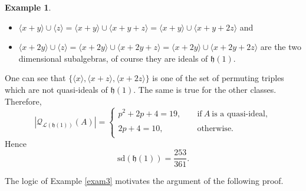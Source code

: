 \documentclass{amsart}
\theoremstyle{definition}
\newtheorem{example}[theorem]{Example}
\numberwithin{equation}{section}
\begin{document}
\begin{example}
\begin{itemize}
\item [3.] $\langle x+y \rangle\cup \langle z \rangle= \langle x+y \rangle\cup \langle x+y+z \rangle=
\langle x+y \rangle\cup \langle x+y+2z \rangle$ and 

\item [4.] $\langle x+2y \rangle\cup \langle z \rangle= \langle x+2y \rangle\cup \langle x+2y+z \rangle=
\langle x+2y \rangle\cup \langle x+2y+2z \rangle$
are the two dimensional subalgebras, of course they are ideals of $\mathfrak{h}(1)$. 
\end{itemize}
One can see that $\{\langle x \rangle, \langle x+z \rangle,\langle x+2z \rangle\}$ is one of the set of permuting triples which are not quasi-ideals of $\mathfrak{h}(1)$. The same is true for the other classes. Therefore,  $$|\mathcal{Q}_{\mathcal{L}(\mathfrak{h}(1))}(A)|=\left\{\begin{array}{lcl} p^2+2p+4=19,&\,\,& \mathrm{if} \ A \ \mbox{is a quasi-ideal}, \\ 
\\ 
 2p+4=10,&\,\,& \mathrm{otherwise}.  \\
 \end{array}\right. %
 $$ Hence \[\mathrm{sd}(\mathfrak{h}(1))=\frac{253}{361}.\]
\end{example}


The logic of Example \ref{exam3} motivates the argument of the following proof.
\end{document}
